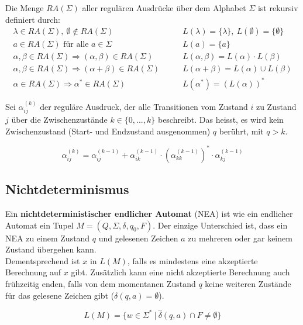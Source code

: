 \documentclass[11pt]{article}
\begin{document}
Die Menge $RA(\Sigma)$ aller regulären Ausdrücke über dem Alphabet $\Sigma$ ist rekursiv definiert durch:
\begin{equation*}
\begin{split}
	\lambda \in RA(\Sigma),\ \emptyset \not\in RA(\Sigma) \qquad & L(\lambda) = \{\lambda\},\ L(\emptyset) = \{\emptyset\} \\
	a \in RA(\Sigma) \text{ für alle } a \in \Sigma \qquad & L(a) = \{a\} \\
	\alpha, \beta \in RA(\Sigma) \Rightarrow (\alpha, \beta) \in RA(\Sigma) \qquad & L(\alpha, \beta) = L(\alpha) \cdot L(\beta) \\
	\alpha, \beta \in RA(\Sigma) \Rightarrow (\alpha + \beta) \in RA(\Sigma) \qquad & L(\alpha + \beta) = L(\alpha) \cup L(\beta) \\
	\alpha \in RA(\Sigma) \Rightarrow \alpha^* \in RA(\Sigma) \qquad & L(\alpha^*) = (L(\alpha))^*
\end{split}
\end{equation*}

Sei $\alpha_{ij}^{(k)}$ der reguläre Ausdruck, der alle Transitionen vom Zustand $i$ zu Zustand $j$ über die Zwischenzustände $k \in \{0,...,k\}$ beschreibt. Das heisst, es wird kein Zwischenzustand (Start- und Endzustand ausgenommen) $q$ berührt, mit $q > k$.

\begin{equation*}
	\alpha_{ij}^{(k)} = \alpha_{ij}^{(k-1)} + \alpha_{ik}^{(k-1)}\cdot (\alpha_{kk}^{(k-1)})^* \cdot \alpha_{kj}^{(k-1)}
\end{equation*}
	
\subsection{Nichtdeterminismus}	

Ein \textbf{nichtdeterministischer endlicher Automat} (NEA) ist wie ein endlicher Automat ein Tupel $M = (Q, \Sigma, \delta, q_0, F)$. Der einzige Unterschied ist, dass ein NEA zu einem Zustand $q$ und gelesenen Zeichen $a$ zu mehreren oder gar keinem Zustand {\"u}bergehen kann. \\
Dementsprechend ist $x$ in $L(M)$, falls es mindestens eine akzeptierte Berechnung auf $x$ gibt. Zus{\"a}tzlich kann eine nicht akzeptierte Berechnung auch fr{\"u}hzeitig enden, falls von dem momentanen Zustand $q$ keine weiteren Zust{\"a}nde f{\"u}r das gelesene Zeichen gibt ($\delta(q, a) = \emptyset$).

\begin{equation*}
	L(M) = \{w \in \Sigma^*\ |\ \hat\delta(q, a) \cap F \neq \emptyset\}
\end{equation*}
\end{document}
